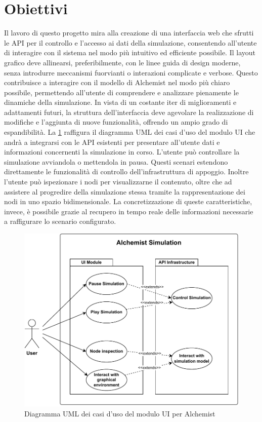 \section{Obiettivi}
Il lavoro di questo progetto mira alla creazione di una interfaccia web che sfrutti le \ac{API} per il controllo e l'accesso ai dati della simulazione, consentendo all'utente di interagire con il sistema nel modo più intuitivo ed efficiente possibile. Il layout grafico deve allinearsi, preferibilmente, con le linee guida di design moderne, senza introdurre meccanismi fuorvianti o interazioni complicate e verbose. Questo contribuisce a interagire con il modello  di Alchemist nel modo più chiaro possibile, permettendo all'utente di comprendere e analizzare pienamente le dinamiche della simulazione.
In vista di un costante iter di miglioramenti e adattamenti futuri, la struttura dell'interfaccia deve agevolare la realizzazione di modifiche e l'aggiunta di nuove funzionalità, offrendo un ampio grado di espandibilità.
La \cref{fig:use-cases} raffigura il diagramma UML dei casi d'uso del modulo UI che andrà a integrarsi con le \ac{API} esistenti per presentare all'utente dati e informazioni concernenti la simulazione in corso. L'utente può controllare la simulazione avviandola o mettendola in pausa. Questi scenari estendono direttamente le funzionalità di controllo dell'infrastruttura di appoggio. Inoltre l'utente può ispezionare i nodi per visualizzarne il contenuto, oltre che ad assistere al progredire della simulazione stessa tramite la rappresentazione dei nodi in uno spazio bidimensionale. La concretizzazione di queste caratteristiche, invece, è possibile grazie al recupero in tempo reale delle informazioni necessarie a raffigurare lo scenario configurato.
\begin{figure}[htb]
	\centering
	\includegraphics[width=.8\linewidth]{imgs/Use_cases.pdf}
	\caption{Diagramma UML dei casi d'uso del modulo UI per Alchemist}
	\label{fig:use-cases}
\end{figure}

